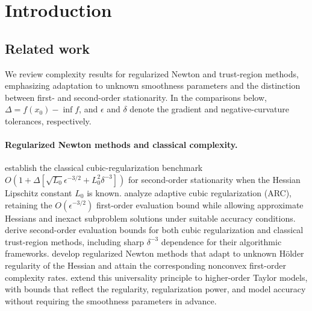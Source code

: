 \section{Introduction}

\subsection{Related work}
We review complexity results for regularized Newton and trust-region
methods, emphasizing adaptation to unknown smoothness parameters and
the distinction between first- and second-order stationarity.
In the comparisons below, $\Delta=f(x_0)-\inf f$, and $\epsilon$ and
$\delta$ denote the gradient and negative-curvature tolerances,
respectively.

\paragraph{Regularized Newton methods and classical complexity.}
\citet{nesterov2006cubic} establish the classical cubic-regularization
benchmark
$O\!\left(1+\Delta[\sqrt{L_0}\epsilon^{-3/2}+L_0^2\delta^{-3}]\right)$
for second-order stationarity when the Hessian Lipschitz constant
$L_0$ is known.
\citet{cartis2011adaptive2} analyze adaptive cubic regularization
(ARC), retaining the $O(\epsilon^{-3/2})$ first-order evaluation bound
while allowing approximate Hessians and inexact subproblem solutions
under suitable accuracy conditions.
\citet{cartis2012second} derive second-order evaluation bounds for
both cubic regularization and classical trust-region methods,
including sharp $\delta^{-3}$ dependence for their algorithmic
frameworks.
\citet{grapiglia2017regularized} develop regularized Newton methods
that adapt to unknown H\"older regularity of the Hessian and attain
the corresponding nonconvex first-order complexity rates.
\citet{cartis2019universal} extend this universality principle to
higher-order Taylor models, with bounds that reflect the regularity,
regularization power, and model accuracy without requiring the
smoothness parameters in advance.

